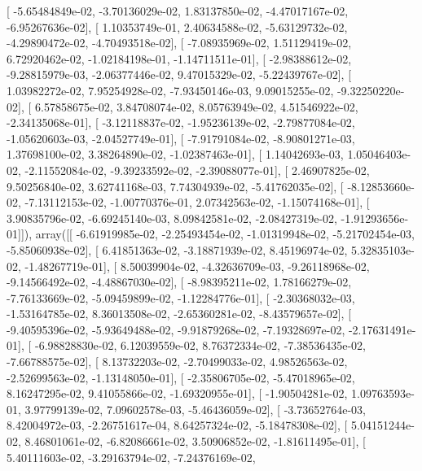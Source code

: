 \documentclass{article}
\begin{document}
       [ -5.65484849e-02,  -3.70136029e-02,   1.83137850e-02,
         -4.47017167e-02,  -6.95267636e-02],
       [  1.10353749e-01,   2.40634588e-02,  -5.63129732e-02,
         -4.29890472e-02,  -4.70493518e-02],
       [ -7.08935969e-02,   1.51129419e-02,   6.72920462e-02,
         -1.02184198e-01,  -1.14711511e-01],
       [ -2.98388612e-02,  -9.28815979e-03,  -2.06377446e-02,
          9.47015329e-02,  -5.22439767e-02],
       [  1.03982272e-02,   7.95254928e-02,  -7.93450146e-03,
          9.09015255e-02,  -9.32250220e-02],
       [  6.57858675e-02,   3.84708074e-02,   8.05763949e-02,
          4.51546922e-02,  -2.34135068e-01],
       [ -3.12118837e-02,  -1.95236139e-02,  -2.79877084e-02,
         -1.05620603e-03,  -2.04527749e-01],
       [ -7.91791084e-02,  -8.90801271e-03,   1.37698100e-02,
          3.38264890e-02,  -1.02387463e-01],
       [  1.14042693e-03,   1.05046403e-02,  -2.11552084e-02,
         -9.39233592e-02,  -2.39088077e-01],
       [  2.46907825e-02,   9.50256840e-02,   3.62741168e-03,
          7.74304939e-02,  -5.41762035e-02],
       [ -8.12853660e-02,  -7.13112153e-02,  -1.00770376e-01,
          2.07342563e-02,  -1.15074168e-01],
       [  3.90835796e-02,  -6.69245140e-03,   8.09842581e-02,
         -2.08427319e-02,  -1.91293656e-01]]), array([[ -6.61919985e-02,  -2.25493454e-02,  -1.01319948e-02,
         -5.21702454e-03,  -5.85060938e-02],
       [  6.41851363e-02,  -3.18871939e-02,   8.45196974e-02,
          5.32835103e-02,  -1.48267719e-01],
       [  8.50039904e-02,  -4.32636709e-03,  -9.26118968e-02,
         -9.14566492e-02,  -4.48867030e-02],
       [ -8.98395211e-02,   1.78166279e-02,  -7.76133669e-02,
         -5.09459899e-02,  -1.12284776e-01],
       [ -2.30368032e-03,  -1.53164785e-02,   8.36013508e-02,
         -2.65360281e-02,  -8.43579657e-02],
       [ -9.40595396e-02,  -5.93649488e-02,  -9.91879268e-02,
         -7.19328697e-02,  -2.17631491e-01],
       [ -6.98828830e-02,   6.12039559e-02,   8.76372334e-02,
         -7.38536435e-02,  -7.66788575e-02],
       [  8.13732203e-02,  -2.70499033e-02,   4.98526563e-02,
         -2.52699563e-02,  -1.13148050e-01],
       [ -2.35806705e-02,  -5.47018965e-02,   8.16247295e-02,
          9.41055866e-02,  -1.69320955e-01],
       [ -1.90504281e-02,   1.09763593e-01,   3.97799139e-02,
          7.09602578e-03,  -5.46436059e-02],
       [ -3.73652764e-03,   8.42004972e-03,  -2.26751617e-04,
          8.64257324e-02,  -5.18478308e-02],
       [  5.04151244e-02,   8.46801061e-02,  -6.82086661e-02,
          3.50906852e-02,  -1.81611495e-01],
       [  5.40111603e-02,  -3.29163794e-02,  -7.24376169e-02,
\end{document}

